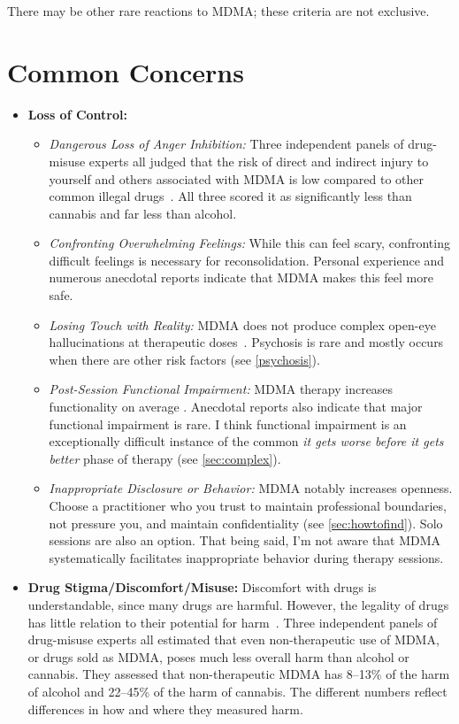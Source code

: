 \documentclass[11pt,oneside]{book}
\let\cite\parencite
\begin{document}
There may be other rare reactions to MDMA; these criteria are not exclusive.

\section{Common Concerns}
\begin{itemize}
    \item \textbf{Loss of Control:}
        \begin{itemize}
            \item \textit{Dangerous Loss of Anger Inhibition:} Three independent panels of drug-misuse experts all judged that the risk of direct and indirect injury to yourself and others associated with MDMA is low compared to other common illegal drugs~\cite{nuttDrugHarms,bonomoHarms,crossinHarms}. All three scored it as significantly less than cannabis and far less than alcohol.
            \item \textit{Confronting Overwhelming Feelings:} While this can feel scary, confronting difficult feelings is necessary for reconsolidation. Personal experience and numerous anecdotal reports indicate that MDMA makes this feel more safe.
            \item \textit{Losing Touch with Reality:} MDMA does not produce complex open-eye hallucinations at therapeutic doses~\cite{liechtiGender}. Psychosis is rare and mostly occurs when there are other risk factors (see \cref{psychosis}).
            \item \textit{Post-Session Functional Impairment:} MDMA therapy increases functionality on average \cite{mitchellMDMAClinicalTrial2,mitchellMDMAClinicalTrial}. Anecdotal reports also indicate that major functional impairment is rare. I think functional impairment is an exceptionally difficult instance of the common \textit{it gets worse before it gets better} phase of therapy (see \cref{sec:complex}).
            \item \textit{Inappropriate Disclosure or Behavior:} MDMA notably increases openness. Choose a practitioner who you trust to maintain professional boundaries, not pressure you, and maintain confidentiality (see \cref{sec:howtofind}). Solo sessions are also an option. That being said, I'm not aware that MDMA systematically facilitates inappropriate behavior during therapy sessions.
        \end{itemize}
    \item \textbf{Drug Stigma/Discomfort/Misuse:}
        Discomfort with drugs is understandable, since many drugs are harmful. However, the legality of drugs has little relation to their potential for harm~\cite{nuttDrugHarms,bonomoHarms,crossinHarms}. Three independent panels of drug-misuse experts all estimated that even non-therapeutic use of MDMA, or drugs sold as MDMA, poses much less overall harm than alcohol or cannabis. They assessed that non-therapeutic MDMA has 8--13\% of the harm of alcohol and 22--45\% of the harm of cannabis. The different numbers reflect differences in how and where they measured harm.

\end{itemize}
\end{document}

